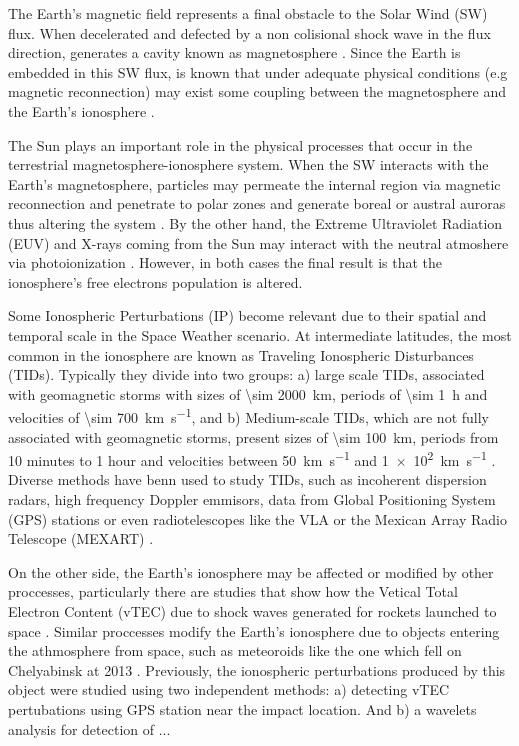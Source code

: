 The Earth's magnetic field represents a final obstacle to the Solar Wind (SW) flux. When decelerated and defected by a non colisional shock wave in the flux direction, generates a cavity known as magnetosphere \citep{Blanco-Cano:2004}. Since the Earth is embedded in this SW flux, is known that under adequate physical conditions (e.g magnetic reconnection) may exist some coupling between the magnetosphere and the Earth's ionosphere \citep{Zolesi:2014, Cnossen:2014}.

The Sun plays an important role in the physical processes that occur in the terrestrial magnetosphere-ionosphere system. When the SW interacts with the Earth's magnetosphere, particles may permeate the internal region via magnetic reconnection and penetrate to polar zones and generate boreal or austral auroras thus altering the system \citep{Vazquez:2016, Oka:2011}. By the other hand, the Extreme Ultraviolet Radiation (EUV) and X-rays coming from the Sun may interact with the neutral atmoshere via photoionization \citep{Vlasov:2010}. However, in both cases the final result is that the ionosphere's free electrons population is altered.

Some Ionospheric Perturbations (IP) become relevant due to their spatial and temporal scale in the Space Weather scenario. At intermediate latitudes, the most common in the ionosphere are known as Traveling Ionospheric Disturbances (TIDs). Typically they divide into two groups: a) large scale TIDs, associated with geomagnetic storms with sizes of \SI{\sim 2000}{km}, periods of \SI{\sim 1}{h} and velocities of \SI{\sim 700}{km.s^{-1}}, and b) Medium-scale TIDs, which are not fully associated with geomagnetic storms, present sizes of \SI{\sim 100}{km}, periods from 10 minutes to 1 hour and velocities between \SI{50}{km.s^{-1}} and \SI{1e2}{km.s^{-1}} \citep{Helmboldt:2012}. Diverse methods have benn used to study TIDs, such as incoherent dispersion radars, high frequency Doppler emmisors, data from Global Positioning System (GPS) stations or even radiotelescopes like the VLA or the Mexican Array Radio Telescope (MEXART) \citep{Chilcote:2015, Rodriguez:2014}.

On the other side, the Earth's ionosphere may be affected or modified by other proccesses, particularly there are studies that show how the Vetical Total Electron Content (vTEC) due to shock waves generated for rockets launched to space \citep{Lin:2014}. Similar proccesses modify the Earth's ionosphere due to objects entering the athmosphere from space, such as meteoroids like the one which fell on Chelyabinsk at 2013 \citep{Yang:2014}. Previously, the ionospheric perturbations produced by this object were studied using two independent methods: a) detecting vTEC pertubations using GPS station near the impact location. And b) a wavelets analysis for detection of ...

